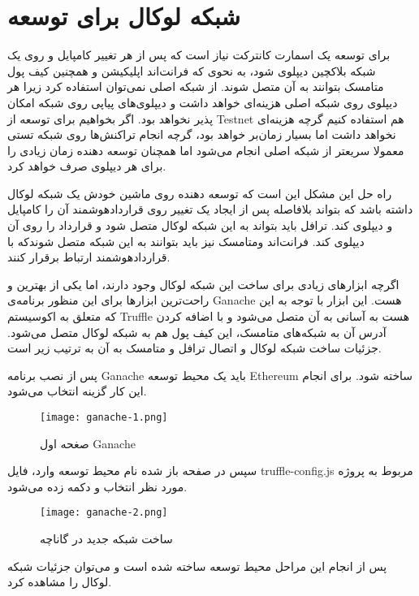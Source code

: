 \section{شبکه لوکال برای توسعه}
برای توسعه یک اسمارت کانترکت نیاز است که پس از هر تغییر کامپایل و روی یک شبکه بلاکچین دیپلوی شود، به نحوی که فرانت‌اند اپلیکیشن و همچنین کیف پول متامسک بتوانند به آن متصل شوند.
از شبکه اصلی نمی‌توان استفاده کرد زیرا هر دیپلوی روی شبکه اصلی هزینه‌ای خواهد داشت و دیپلوی‌های پیاپی روی شبکه امکان پذیر نخواهد بود.
اگر بخواهیم برای توسعه از
\gls{Testnet}
هم استفاده کنیم گرچه هزینه‌ای نخواهد داشت اما بسیار زمان‌بر خواهد بود، گرچه انجام تراکنش‌ها روی شبکه تستی معمولا سریعتر از شبکه اصلی انجام می‌شود اما همچنان توسعه دهنده زمان زیادی را برای هر دیپلوی صرف خواهد کرد.

راه حل این مشکل این است که توسعه دهنده روی ماشین خودش یک شبکه لوکال داشته باشد که بتواند بلافاصله پس از ایجاد یک تغییر روی قراردادهوشمند آن را کامپایل و دیپلوی کند. ترافل باید بتواند به این شبکه لوکال متصل شود و قرارداد را روی آن دیپلوی کند. فرانت‌اند ومتامسک نیز باید بتوانند به این شبکه متصل شوندکه با قراردادهوشمند ارتباط برقرار کنند.

اگرچه ابزارهای زیادی برای ساخت این شبکه لوکال وجود دارند، اما یکی از بهترین و راحت‌ترین ابزارها برای این منظور برنامه‌ی Ganache هست. این ابزار با توجه به این که متعلق به اکوسیستم Truffle هست به آسانی به آن متصل می‌شود و با اضافه کردن آدرس آن به شبکه‌های متامسک، این کیف پول هم به شبکه لوکال متصل می‌شود. جزئیات ساخت شبکه لوکال و اتصال ترافل و متامسک به آن به ترتیب زیر است.

پس از نصب برنامه Ganache باید یک محیط توسعه Ethereum ساخته شود. برای انجام این کار گزینه
انتخاب می‌شود.

\begin{figure}[ht]
\centerline{\texttt{[image: ganache-1.png]}}
\caption{صغحه اول Ganache}
\label{fig:ganache-1}
\end{figure}

سپس در صفحه باز شده نام محیط توسعه وارد،  فایل truffle-config.js مربوط به پروژه مورد نظر انتخاب و دکمه
زده می‌شود.

\begin{figure}[ht]
\centerline{\texttt{[image: ganache-2.png]}}
\caption{ساخت شبکه جدید در گاناچه}
\label{fig:ganache-2}
\end{figure}

پس از انجام این مراحل محیط توسعه ساخته شده است و می‌توان جزئیات شبکه لوکال را مشاهده کرد.

